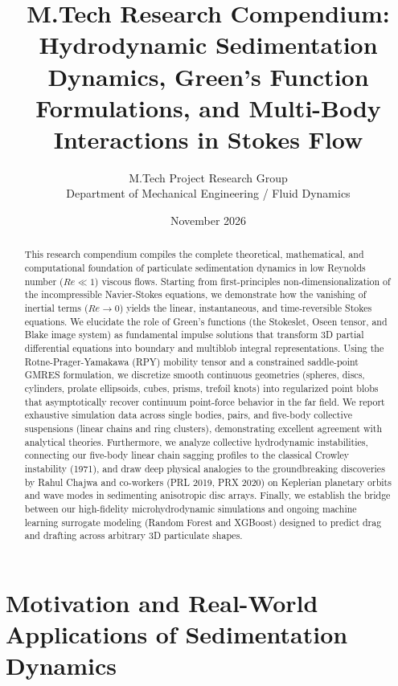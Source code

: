 \documentclass[11pt,a4paper]{article}
\title{\textbf{M.Tech Research Compendium: Hydrodynamic Sedimentation Dynamics, Green's Function Formulations, and Multi-Body Interactions in Stokes Flow}}
\author{M.Tech Project Research Group \\ Department of Mechanical Engineering / Fluid Dynamics}
\date{November 2026}
\begin{document}
\maketitle

\begin{abstract}
This research compendium compiles the complete theoretical, mathematical, and computational foundation of particulate sedimentation dynamics in low Reynolds number ($Re \ll 1$) viscous flows. Starting from first-principles non-dimensionalization of the incompressible Navier-Stokes equations, we demonstrate how the vanishing of inertial terms ($Re \to 0$) yields the linear, instantaneous, and time-reversible Stokes equations. We elucidate the role of Green's functions (the Stokeslet, Oseen tensor, and Blake image system) as fundamental impulse solutions that transform 3D partial differential equations into boundary and multiblob integral representations. Using the Rotne-Prager-Yamakawa (RPY) mobility tensor and a constrained saddle-point GMRES formulation, we discretize smooth continuous geometries (spheres, discs, cylinders, prolate ellipsoids, cubes, prisms, trefoil knots) into regularized point blobs that asymptotically recover continuum point-force behavior in the far field. We report exhaustive simulation data across single bodies, pairs, and five-body collective suspensions (linear chains and ring clusters), demonstrating excellent agreement with analytical theories. Furthermore, we analyze collective hydrodynamic instabilities, connecting our five-body linear chain sagging profiles to the classical Crowley instability (1971), and draw deep physical analogies to the groundbreaking discoveries by Rahul Chajwa and co-workers (PRL 2019, PRX 2020) on Keplerian planetary orbits and wave modes in sedimenting anisotropic disc arrays. Finally, we establish the bridge between our high-fidelity microhydrodynamic simulations and ongoing machine learning surrogate modeling (Random Forest and XGBoost) designed to predict drag and drafting across arbitrary 3D particulate shapes.
\end{abstract}

\tableofcontents
\newpage

\section{Motivation and Real-World Applications of Sedimentation Dynamics}
\end{document}
